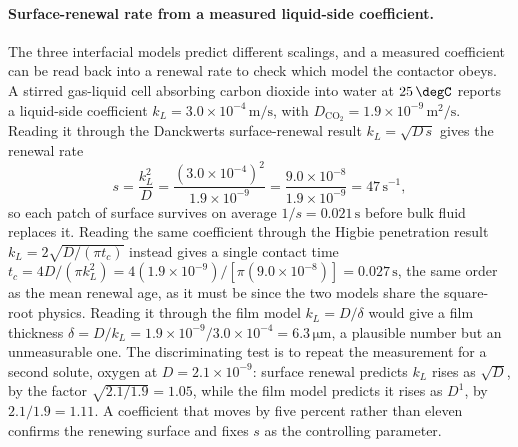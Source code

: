 \paragraph{Surface-renewal rate from a measured liquid-side coefficient.}
The three interfacial models predict different scalings, and a measured
coefficient can be read back into a renewal rate to check which model the
contactor obeys. A stirred gas-liquid cell absorbing carbon dioxide into
water at $25\,\degC$ reports a liquid-side coefficient $k_L = 3.0\times
10^{-4}\,\text{m/s}$, with $D_{\text{CO}_2} = 1.9\times 10^{-9}\,\si{
\meter\squared\per\second}$. Reading it through the Danckwerts
surface-renewal result $k_L = \sqrt{D\,s}$ gives the renewal rate
\[
s = \frac{k_L^2}{D} = \frac{(3.0\times 10^{-4})^2}{1.9\times 10^{-9}} =
\frac{9.0\times 10^{-8}}{1.9\times 10^{-9}} = 47\,\text{s}^{-1},
\]
so each patch of surface survives on average $1/s = 0.021\,\text{s}$
before bulk fluid replaces it. Reading the same coefficient through the
Higbie penetration result $k_L = 2\sqrt{D/(\pi t_c)}$ instead gives a
single contact time $t_c = 4D/(\pi k_L^2) = 4(1.9\times 10^{-9})/
[\pi(9.0\times 10^{-8})] = 0.027\,\text{s}$, the same order as the mean
renewal age, as it must be since the two models share the square-root
physics. Reading it through the film model $k_L = D/\delta$ would give a
film thickness $\delta = D/k_L = 1.9\times 10^{-9}/3.0\times 10^{-4} =
6.3\,\si{\micro\meter}$, a plausible number but an unmeasurable one. The
discriminating test is to repeat the measurement for a second solute,
oxygen at $D = 2.1\times 10^{-9}$: surface renewal predicts $k_L$ rises as
$\sqrt{D}$, by the factor $\sqrt{2.1/1.9} = 1.05$, while the film model
predicts it rises as $D^{1}$, by $2.1/1.9 = 1.11$. A coefficient that
moves by five percent rather than eleven confirms the renewing surface and
fixes $s$ as the controlling parameter.

